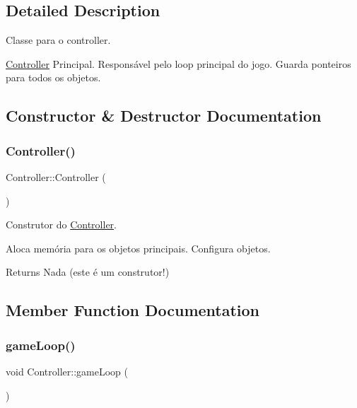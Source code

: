 \subsection{Detailed Description}
Classe para o controller. 

\hyperlink{classController}{Controller} Principal. Responsável pelo loop principal do jogo. Guarda ponteiros para todos os objetos. 

\subsection{Constructor \& Destructor Documentation}
\mbox{\label{classController_a95c56822d667e94b031451729ce069a9}} 
\subsubsection{\texorpdfstring{Controller()}{Controller()}}
{\footnotesize\ttfamily Controller\+::\+Controller (\begin{DoxyParamCaption}{ }\end{DoxyParamCaption})}



Construtor do \hyperlink{classController}{Controller}. 

Aloca memória para os objetos principais. Configura objetos.

\begin{DoxyReturn}{Returns}
Nada (este é um construtor!) 
\end{DoxyReturn}


\subsection{Member Function Documentation}
\mbox{\label{classController_a31ede2d3d9dba71913635bfe025b443d}} 
\subsubsection{\texorpdfstring{game\+Loop()}{gameLoop()}}
{\footnotesize\ttfamily void Controller\+::game\+Loop (\begin{DoxyParamCaption}{ }\end{DoxyParamCaption})}



